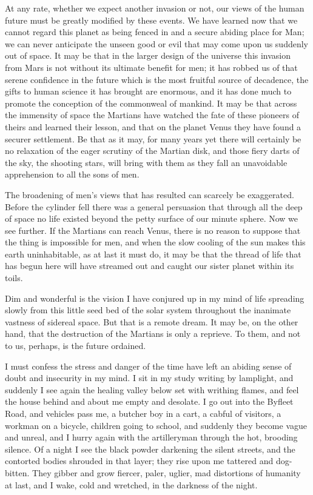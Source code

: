 At any rate, whether we expect another invasion or not, our views
of the human future must be greatly modified by these events. We
have learned now that we cannot regard this planet as being fenced
in and a secure abiding place for Man; we can never anticipate the
unseen good or evil that may come upon us suddenly out of space. It
may be that in the larger design of the universe this invasion from
Mars is not without its ultimate benefit for men; it has robbed us
of that serene confidence in the future which is the most fruitful
source of decadence, the gifts to human science it has brought are
enormous, and it has done much to promote the conception of the
commonweal of mankind. It may be that across the immensity of space
the Martians have watched the fate of these pioneers of theirs and
learned their lesson, and that on the planet Venus they have found
a securer settlement. Be that as it may, for many years yet there
will certainly be no relaxation of the eager scrutiny of the
Martian disk, and those fiery darts of the sky, the shooting stars,
will bring with them as they fall an unavoidable apprehension to
all the sons of men.

The broadening of men's views that has resulted can scarcely be
exaggerated. Before the cylinder fell there was a general
persuasion that through all the deep of space no life existed
beyond the petty surface of our minute sphere. Now we see further.
If the Martians can reach Venus, there is no reason to suppose that
the thing is impossible for men, and when the slow cooling of the
sun makes this earth uninhabitable, as at last it must do, it may
be that the thread of life that has begun here will have streamed
out and caught our sister planet within its toils.

Dim and wonderful is the vision I have conjured up in my mind of
life spreading slowly from this little seed bed of the solar system
throughout the inanimate vastness of sidereal space. But that is a
remote dream. It may be, on the other hand, that the destruction of
the Martians is only a reprieve. To them, and not to us, perhaps,
is the future ordained.

I must confess the stress and danger of the time have left an
abiding sense of doubt and insecurity in my mind. I sit in my study
writing by lamplight, and suddenly I see again the healing valley
below set with writhing flames, and feel the house behind and about
me empty and desolate. I go out into the Byfleet Road, and vehicles
pass me, a butcher boy in a cart, a cabful of visitors, a workman
on a bicycle, children going to school, and suddenly they become
vague and unreal, and I hurry again with the artilleryman through
the hot, brooding silence. Of a night I see the black powder
darkening the silent streets, and the contorted bodies shrouded in
that layer; they rise upon me tattered and dog-bitten. They gibber
and grow fiercer, paler, uglier, mad distortions of humanity at
last, and I wake, cold and wretched, in the darkness of the night.

